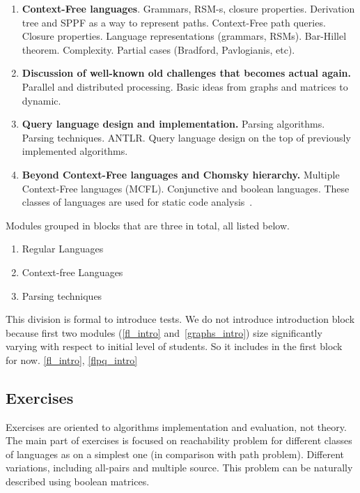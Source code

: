 \documentclass[sigconf]{acmart}
\begin{document}
\begin{enumerate}
  \item \label{cf_languages_intro} \textbf{Context-Free languages}. Grammars, RSM-s, closure properties. Derivation tree and SPPF as a way to represent paths. Context-Free path queries. 
  Closure properties. 
  Language representations (grammars, RSMs). 
  Bar-Hillel theorem. 
  Complexity. 
  Partial cases (Bradford, Pavlogianis, etc).
  
  \item \label{new_old_problems_discussion} \textbf{Discussion of well-known old challenges that becomes actual again.} 
  Parallel and distributed processing. 
  Basic ideas from graphs and matrices to dynamic. 
  
  \item \label{parsing_techniques} \textbf{Query language design and implementation.}
  Parsing algorithms. 
  Parsing techniques.
  ANTLR.
  Query language design on the top of previously implemented algorithms. 
    
  \item \label{beyond_chomsky_hierarchy} \textbf{Beyond Context-Free languages and Chomsky hierarchy.}
  Multiple Context-Free languages (MCFL). 
  Conjunctive and boolean languages. 
  These classes of languages are used for static code analysis~\cite{!!!}.

\end{enumerate}

Modules grouped in blocks that are three in total, all listed below.
\begin{enumerate}
  \item Regular Languages
  \item Context-free Languages
  \item Parsing techniques
\end{enumerate}

This division is formal to introduce tests.
We do not introduce introduction block because first two modules (\ref{fl_intro} and~\ref{graphs_intro}) size significantly varying with respect to initial level of students.
So it includes in the first block for now. \ref{fl_intro}, \ref{flpq_intro}


\subsection{Exercises}

Exercises are oriented to algorithms implementation and evaluation, not theory. 
The main part of exercises is focused on reachability problem for different classes of languages as on a simplest one (in comparison with path problem). 
Different variations, including all-pairs and multiple source.
This problem can be naturally described using boolean matrices. 
\end{document}
